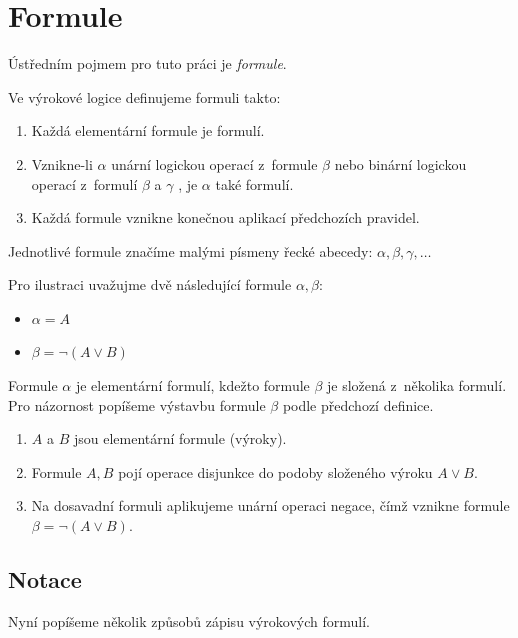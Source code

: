 \documentclass[thesis=B,czech,hidelinks]{thesis}[2012/06/26]
\begin{document}
\section{Formule}

Ústředním pojmem pro tuto práci je \emph{formule}.

\begin{dfn}
\label{dfn:formula}
Ve výrokové logice definujeme formuli takto:

\begin{enumerate}
	\item Každá elementární formule je formulí.
	\item Vznikne-li $\alpha$ unární logickou operací z~formule $\beta$ nebo binární logickou operací z~formulí $\beta$ a $\gamma$ , je $\alpha$ také formulí.
	\item Každá formule vznikne konečnou aplikací předchozích pravidel\cite{sochor}.
\end{enumerate}
\end{dfn}

Jednotlivé formule značíme malými písmeny řecké abecedy: $\alpha , \beta , \gamma , \ldots$

\begin{exm}
Pro ilustraci uvažujme dvě následující formule $\alpha, \beta$:
\begin{itemize}
	\item $\alpha = A$
	\item $\beta = \neg (A \vee B)$
\end{itemize}
Formule $\alpha$ je elementární formulí, kdežto formule $\beta$ je složená z~několika formulí. Pro názornost popíšeme výstavbu formule $\beta$ podle předchozí definice.
\begin{enumerate}
	\item $A$ a $B$ jsou elementární formule (výroky).
	\item Formule $A, B$ pojí operace disjunkce do podoby složeného výroku $A \vee B$.
	\item Na dosavadní formuli aplikujeme unární operaci negace, čímž vznikne formule $\beta = \neg (A \vee B)$.
\end{enumerate}
\end{exm}

\subsection{Notace}

Nyní popíšeme několik způsobů zápisu výrokových formulí.
\end{document}
